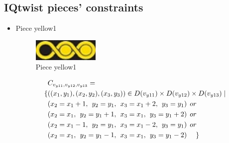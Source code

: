 \begin{appendices}
\renewcommand\thechapter{}
\renewcommand\thesection{\arabic{section}}
\renewcommand\thesubsection{\thesection.\arabic{subsection}}
\renewcommand\thefigure{\arabic{figure}}
\renewcommand\thetable{\arabic{table}}
\section{IQtwist pieces' constraints}
\label{appendix:2Dpieces}
\begin{itemize}
  \item Piece yellow1\\
\begin{figure}[H]
    \centering
    \includegraphics[width=0.3\textwidth]{figs/yellow1.jpg}
    \caption{Piece yellow1}
\end{figure}
  \begin{align*}
&C_{v_{y11},v_{y12},v_{y13}}=\\
\{&((x_{1},y_{1}),(x_{2},y_{2}),(x_{3},y_{3}))\in D(v_{y11})\times D(v_{y12})\times D(v_{y13})\mid\\
&(x_{2} = x_{1} + 1,\hspace{1ex}y_{2} = y_{1},\hspace{1ex}x_{3} = x_{1} + 2, \hspace{1ex}y_{3} = y_{1})\hspace{1ex} or\\
&(x_{2} = x_{1},\hspace{1ex}y_{2} = y_{1}+1,\hspace{1ex}x_{3} = x_{1}, \hspace{1ex}y_{3} = y_{1}+2)\hspace{1ex} or\\
&(x_{2} = x_{1}-1,\hspace{1ex}y_{2} = y_{1},\hspace{1ex}x_{3} = x_{1}-2,\hspace{1ex} y_{3} = y_{1})\hspace{1ex} or\\
&(x_{2} = x_{1},\hspace{1ex}y_{2} = y_{1}-1,\hspace{1ex}x_{3} = x_{1}, \hspace{1ex}y_{3} = y_{1}-2)\hspace{3ex} \}
\end{align*} 

\end{itemize}
\end{appendices}
